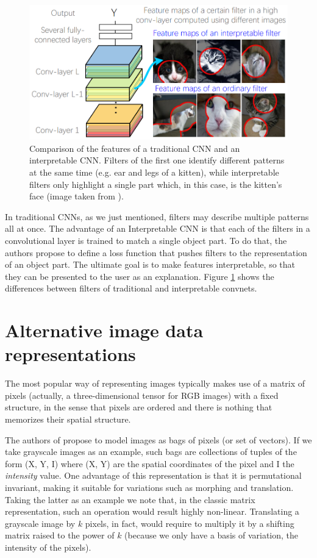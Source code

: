 \documentclass[12pt, twoside, a4paper]{report}
\begin{document}
\begin{figure}
\centering
\includegraphics[width=.9\linewidth]{images/paper-images/interpretable-convnets.png}
\caption{Comparison of the features of a traditional CNN and an interpretable CNN. Filters of the first one identify different patterns at the same time (e.g. ear and legs of a kitten), while interpretable filters only highlight a single part which, in this case, is the kitten's face (image taken from \cite{interpretable-convnets}).}
\label{fig:interpretable-convnets}
\end{figure}


In traditional CNNs, as we just mentioned, filters may describe multiple patterns all at once. The advantage of an Interpretable CNN is that each of the filters in a convolutional layer is trained to match a single object part. To do that, the authors propose to define a loss function that pushes filters to the representation of an object part.
The ultimate goal is to make features interpretable, so that they can be presented to the user as an explanation.
Figure \ref{fig:interpretable-convnets} shows the differences between filters of traditional and interpretable convnets. 

\section{Alternative image data representations}

The most popular way of representing images typically makes use of a matrix of pixels (actually, a three-dimensional tensor for RGB images) with a fixed structure, in the sense that pixels are ordered and there is nothing that memorizes their spatial structure.

The authors of \cite{bag-of-pixels} propose to model images as bags of pixels (or set of vectors). If we take grayscale images as an example, such bags are collections of tuples of the form (X, Y, I) where (X, Y) are the spatial coordinates of the pixel and I the \textit{intensity} value. One advantage of this representation is that it is permutational invariant, making it suitable for variations such as morphing and translation. Taking the latter as an example we note that, in the classic matrix representation, such an operation would result highly non-linear. Translating a grayscale image by $k$ pixels, in fact, would require to multiply it by a shifting matrix raised to the power of $k$ (because we only have a basis of variation, the intensity of the pixels). 
\end{document}
